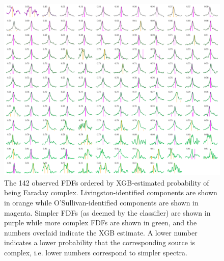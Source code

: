   \begin{figure}
    \centering
    \includegraphics[width=\linewidth]{faraday-images/both_spectra_xgb.pdf}
    \caption[The 142 observed FDFs ordered by XGB-estimated probability of being Faraday complex.]{The 142 observed FDFs ordered by XGB-estimated probability of being Faraday complex. Livingston-identified components are shown in orange while O'Sullivan-identified components are shown in magenta. Simpler FDFs (as deemed by the classifier) are shown in purple while more complex FDFs are shown in green, and the numbers overlaid indicate the XGB estimate. A lower number indicates a lower probability that the corresponding source is complex, i.e. lower numbers correspond to simpler spectra.}
    \label{fig:faraday-all-observed-fdfs-xgb}
  \end{figure}

\unappendix